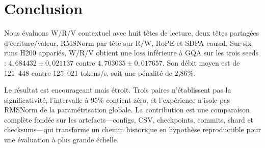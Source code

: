 \section{Conclusion}

Nous évaluons W/R/V contextuel avec huit têtes de lecture, deux têtes partagées d'écriture/valeur, RMSNorm par tête sur R/W, RoPE et SDPA causal. Sur six runs H200 appariés, W/R/V obtient une loss inférieure à GQA sur les trois seeds : $4,684432\pm0,021137$ contre $4,703035\pm0,017657$. Son débit moyen est de 121~448 contre 125~021 tokens/s, soit une pénalité de 2,86\%.

Le résultat est encourageant mais étroit. Trois paires n'établissent pas la significativité, l'intervalle à 95\% contient zéro, et l'expérience n'isole pas RMSNorm de la paramétrisation globale. La contribution est une comparaison complète fondée sur les artefacts---configs, CSV, checkpoints, commits, shard et checksums---qui transforme un chemin historique en hypothèse reproductible pour une évaluation à plus grande échelle.